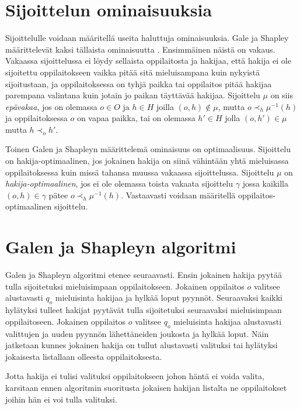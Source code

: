 \documentclass[gradu, twoside]{tktltiki}
\begin{document}
\section{Sijoittelun ominaisuuksia}

Sijoittelulle voidaan määritellä useita haluttuja ominaisuuksia. Gale
ja Shapley määrittelevät kaksi tällaista ominaisuutta
\cite{galeshapley62}. Ensimmäinen näistä on vakaus. Vakaassa
sijoittelussa ei löydy sellaista oppilaitosta ja hakijaa, että hakija
ei ole sijoitettu oppilaitokseen vaikka pitää sitä mieluisampana kuin
nykyistä sijoitustaan, ja oppilaitoksessa on tyhjä paikka tai
oppilaitos pitää hakijaa parempana valintana kuin jotain jo paikan
täyttävää hakijaa. Sijoittelu $\mu$ on siis \emph{epävakaa}, jos on
olemassa $o \in O$ ja $h \in H$ joilla $(o, h) \notin \mu$, mutta $o
\prec_h \mu^{-1}(h)$ ja oppilaitoksessa $o$ on vapaa paikka, tai on
olemassa $h' \in H$ jolla $(o, h') \in \mu$ mutta $h \prec_o h'$.

Toinen Galen ja Shapleyn määrittelemä ominaisuus on optimaalisuus.
Sijoittelu on hakija-optimaalinen, jos jokainen hakija on siinä
vähintään yhtä mieluisassa oppilaitoksessa kuin missä tahansa muussa
vakaassa sijoittelussa. Sijoittelu $\mu$ on
\emph{hakija-optimaalinen}, jos ei ole olemassa toista vakaata
sijoittelu $\gamma$ jossa kaikilla $(o, h) \in \gamma$ pätee $o
\prec_h \mu^{-1}(h)$. Vastaavasti voidaan määritellä
oppilaitos-optimaalinen sijoittelu.

\section{Galen ja Shapleyn algoritmi}

Galen ja Shapleyn algoritmi etenee seuraavasti. Ensin jokainen hakija
pyytää tulla sijoitetuksi mieluisimpaan oppilaitokseen. Jokainen
oppilaitos $o$ valitsee alustavasti $q_o$ mieluisinta hakijaa ja
hylkää loput pyynnöt. Seuraavaksi kaikki hylätyksi tulleet hakijat
pyytävät tulla sijoitetuksi seuraavaksi mieluisimpaan oppilaitoseen.
Jokainen oppilaitos $o$ valitsee $q_o$ mieluisinta hakijaa alustavasti
valittujen ja uuden pyynnön lähettäneiden joukosta ja hylkää loput.
Näin jatketaan kunnes jokainen hakija on tullut alustavasti valituksi
tai hylätyksi jokaisesta listallaan olleesta oppilaitoksesta.

Jotta hakija ei tulisi valituksi oppilaitokseen johon häntä ei voida
valita, karsitaan ennen algoritmin suoritusta jokaisen hakijan
listalta ne oppilaitokset joihin hän ei voi tulla valituksi.
\end{document}
